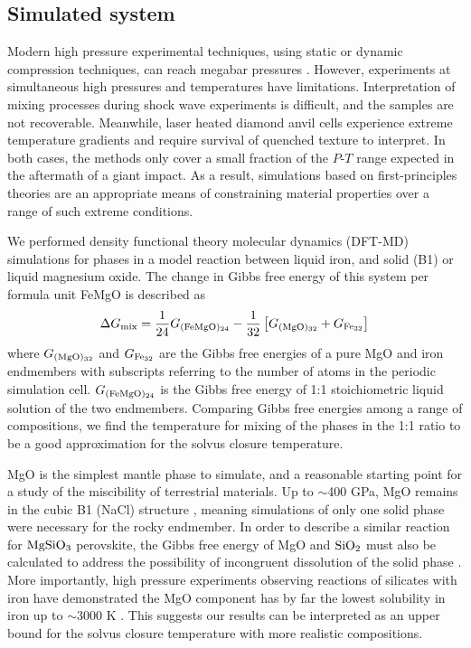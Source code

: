 \subsection{Simulated system}

Modern high pressure experimental techniques, using static or dynamic compression
techniques, can reach megabar pressures \citep{Boehler2000}. However, experiments at
simultaneous high pressures and temperatures have limitations. Interpretation of mixing
processes during shock wave experiments is difficult, and the samples are not
recoverable. Meanwhile, laser heated diamond anvil cells experience extreme temperature
gradients and require survival of quenched texture to interpret. In both cases, the
methods only cover a small fraction of the $P$-$T$ range expected in the aftermath of a
giant impact.  As a result, simulations based on first-principles theories are an
appropriate means of constraining material properties over a range of such extreme
conditions. 

We performed density functional theory molecular dynamics (DFT-MD) simulations for phases
in a model reaction between liquid iron, and solid (B1) or liquid magnesium oxide. The
change in Gibbs free energy of this system per formula unit FeMgO is described as
\begin{equation} \label{eqn:gibbs}
  \Delta G_{\rm{\rm mix}}  =  \frac{1}{24}G_{\rm{(FeMgO)_{24}}} 
- \frac{1}{32} \left[  G_{\rm{(MgO)_{32}}}  + G_{\rm{Fe_{32}}} \right]
\end{equation}
where $G_{\rm{(MgO)_{32}}}$ and   $G_{\rm{Fe_{32}}}$ are the Gibbs free energies of a
pure MgO and iron endmembers with subscripts referring to the number of atoms in the
periodic simulation cell. $G_{\rm{(FeMgO)_{24}}}$ is the Gibbs free energy of 1:1
stoichiometric liquid solution of the two endmembers. Comparing Gibbs free energies among
a range of compositions, we find the temperature for mixing of the phases in the
1:1 ratio to be a good approximation for the solvus closure temperature.

MgO is the simplest mantle phase to simulate, and a reasonable starting point for a study
of the miscibility of terrestrial materials. Up to $\sim$400 GPa, MgO remains in the
cubic B1 (NaCl) structure \citep{Boates2013}, meaning simulations of only one solid phase
were necessary for the rocky endmember. In order to describe a similar reaction for ${\rm
MgSiO_3}$ perovskite, the Gibbs free energy of MgO and ${\rm SiO_2}$ must also be
calculated to address the possibility of incongruent dissolution of the solid phase
\citep{Boates2013}. More importantly, high pressure experiments observing reactions of
silicates with iron have demonstrated the MgO component has by far the lowest solubility
in iron up to $\sim$3000 K \citep{Knittle1991,Ozawa2008a}. This suggests our results  can
be interpreted as an upper bound for the solvus closure temperature with more realistic
compositions. 

